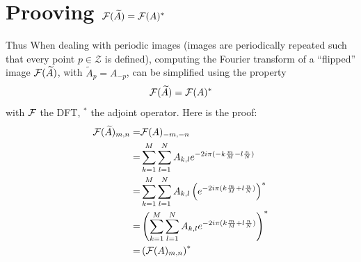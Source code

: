 \FloatBarrier

\section{Prooving ${\mathcal F}(\widetilde{A}) = {\mathcal F}(A)^*$}Thus\label{sec_proof_fourier_flip_adjoint}
When dealing with periodic images (images are periodically repeated such that every point $p \in \mathcal{Z}$ is defined), computing the Fourier transform of a “flipped” image ${\mathcal F}(\widetilde{A})$, with $\widetilde{A}_p = A_{-p}$, can be simplified using the property
\begin{equation*}
{\mathcal F}(\widetilde{A}) = {\mathcal F}(A)^*
\end{equation*}
with ${\mathcal F}$ the \ac{DFT}, $^*$ the adjoint operator. Here is the proof:
\begin{align*}
{\mathcal F}({\widetilde{A}})_{m,n} =& {\mathcal F}(A)_{-m,-n} \\
=& \sum_{k=1}^M \sum_{l=1}^N A_{k,l} e^{-2i\pi (-k\frac{m}{M}-l \frac{n}{N})}\\
=& \sum_{k=1}^M \sum_{l=1}^N A_{k,l} \left( e^{-2i\pi (k\frac{m}{M}+l \frac{n}{N})} \right)^*\\
=& \left( \sum_{k=1}^M \sum_{l=1}^N A_{k,l} e^{-2i\pi (k\frac{m}{M}+l \frac{n}{N})} \right)^*\\
=& \left( {\mathcal F}(A)_{m,n} \right)^*
\end{align*}



\printglossary
{\let\clearpage\relax \printacronyms}
\printbibliography[title=References]






